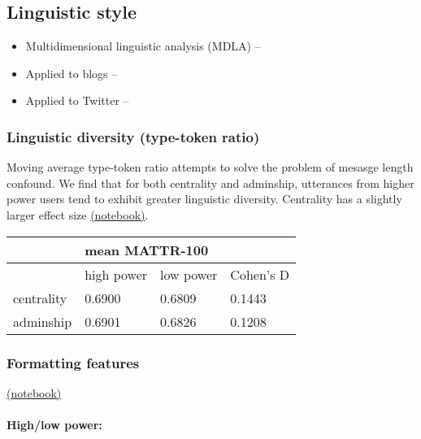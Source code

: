 \documentclass[12pt]{scrartcl}
\newcommand{\bill}[1]{\todo[color=blue!40]{#1}}
\begin{document}
\subsection{Linguistic style}
\begin{itemize}
  \item Multidimensional linguistic analysis (MDLA) -- \cite{biber_variation_1988}
  \item Applied to blogs -- \cite{grieve_variation_2011}
  \item Applied to Twitter -- \cite{clarke_dimensions_2017}
\end{itemize}
\subsubsection{Linguistic diversity (type-token ratio)}
Moving average type-token ratio \cite{covington_cutting_2010} attempts to solve the problem of mesasge length confound. We find that for both centrality and adminship, utterances from higher power users tend to exhibit greater linguistic diversity. Centrality \bill{v. high varriant} has a slightly larger effect size \href{https://github.com/winobes/lasn/blob/cf852ec9946123a182db004afec20fa30d1e4dfa/code/analysis.ipynb}{(notebook)}.

\begin{table}[H]
\centering
\begin{tabular}{@{}llll@{}}
\toprule
           & \multicolumn{2}{l}{mean MATTR-100} &           \\ \midrule
           & high power       & low power       & Cohen's D \\ \midrule
centrality & 0.6900           & 0.6809          & 0.1443    \\
adminship  & 0.6901           & 0.6826          & 0.1208    \\ \bottomrule
\end{tabular}
\end{table}

\subsubsection{Formatting features}
\href{https://github.com/winobes/lasn/blob/51e511dd7ff6adf9d66fbf081def203566b1bce7/code/analysis.ipynb}{(notebook)}

\paragraph{High/low power:}
\end{document}
